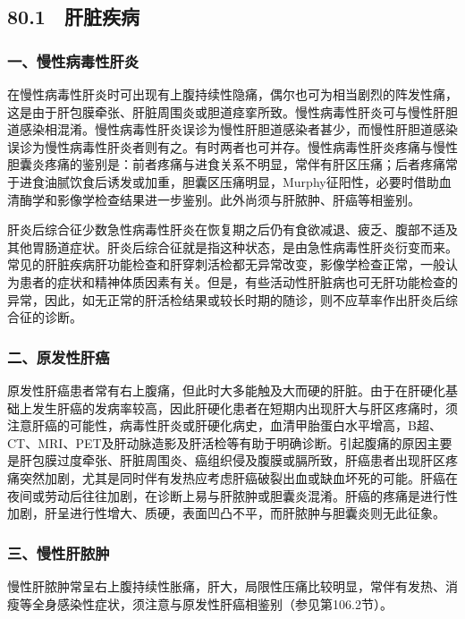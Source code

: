 \subsection{80.1　肝脏疾病}

\subsubsection{一、慢性病毒性肝炎}

在慢性病毒性肝炎时可出现有上腹持续性隐痛，偶尔也可为相当剧烈的阵发性痛，这是由于肝包膜牵张、肝脏周围炎或胆道痉挛所致。慢性病毒性肝炎可与慢性肝胆道感染相混淆。慢性病毒性肝炎误诊为慢性肝胆道感染者甚少，而慢性肝胆道感染误诊为慢性病毒性肝炎者则有之。有时两者也可并存。慢性病毒性肝炎疼痛与慢性胆囊炎疼痛的鉴别是：前者疼痛与进食关系不明显，常伴有肝区压痛；后者疼痛常于进食油腻饮食后诱发或加重，胆囊区压痛明显，Murphy征阳性，必要时借助血清酶学和影像学检查结果进一步鉴别。此外尚须与肝脓肿、肝癌等相鉴别。

肝炎后综合征少数急性病毒性肝炎在恢复期之后仍有食欲减退、疲乏、腹部不适及其他胃肠道症状。肝炎后综合征就是指这种状态，是由急性病毒性肝炎衍变而来。常见的肝脏疾病肝功能检查和肝穿刺活检都无异常改变，影像学检查正常，一般认为患者的症状和精神体质因素有关。但是，有些活动性肝脏病也可无肝功能检查的异常，因此，如无正常的肝活检结果或较长时期的随诊，则不应草率作出肝炎后综合征的诊断。

\subsubsection{二、原发性肝癌}

原发性肝癌患者常有右上腹痛，但此时大多能触及大而硬的肝脏。由于在肝硬化基础上发生肝癌的发病率较高，因此肝硬化患者在短期内出现肝大与肝区疼痛时，须注意肝癌的可能性，病毒性肝炎或肝硬化病史，血清甲胎蛋白水平增高，B超、CT、MRI、PET及肝动脉造影及肝活检等有助于明确诊断。引起腹痛的原因主要是肝包膜过度牵张、肝脏周围炎、癌组织侵及腹膜或膈所致，肝癌患者出现肝区疼痛突然加剧，尤其是同时伴有发热应考虑肝癌破裂出血或缺血坏死的可能。肝癌在夜间或劳动后往往加剧，在诊断上易与肝脓肿或胆囊炎混淆。肝癌的疼痛是进行性加剧，肝呈进行性增大、质硬，表面凹凸不平，而肝脓肿与胆囊炎则无此征象。

\subsubsection{三、慢性肝脓肿}

慢性肝脓肿常呈右上腹持续性胀痛，肝大，局限性压痛比较明显，常伴有发热、消瘦等全身感染性症状，须注意与原发性肝癌相鉴别（参见第106.2节）。

